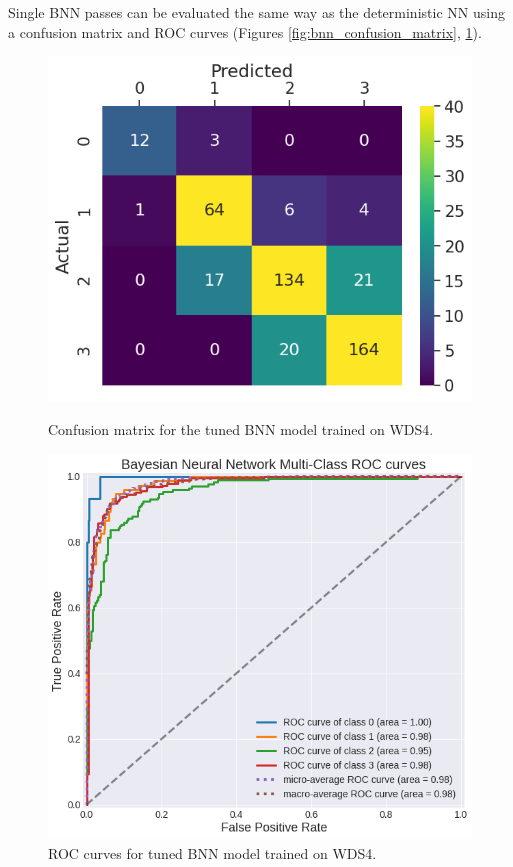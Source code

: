 Single BNN passes can be evaluated the same way as the deterministic NN using a confusion matrix and ROC curves (Figures \ref{fig:bnn_confusion_matrix}, \ref{fig:bnn_auc}).

\begin{figure}[!htp]
\centering
\begin{minipage}[b][][b]{.45\textwidth}
    \includegraphics[width=\linewidth]{templates/images/Figure-BNN-ConfusionMatrix_WDS4.png}
    \caption[Bayesian neural network confusion matrix]{Confusion matrix for the tuned BNN model trained on WDS4.}
    \label{fig:bnn_confusion_matrix}
\end{minipage}
\hfill
\begin{minipage}[b][][b]{.51\textwidth}
    \includegraphics[width=\linewidth]{templates/images/Figure-BNN-AUC_WDS4.png}
    \caption[Bayesian neural network ROC curves]{ROC curves for tuned BNN model trained on WDS4.}
    \label{fig:bnn_auc}
\end{minipage}
\end{figure}

